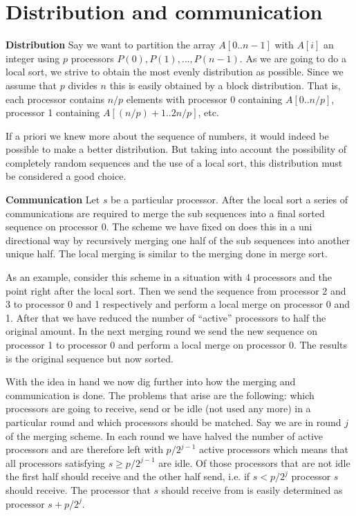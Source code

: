 \documentclass[a4paper,12pt,article]{memoir}
\theoremstyle{plain}
\theoremstyle{definition}
\theoremstyle{remark}
\theoremstyle{plain}
\theoremstyle{remark}
\begin{document}
\section{Distribution and communication}
\textbf{Distribution} Say we want to partition the array $A[0..n-1]$ with $A[i]$ an integer using $p$ processors $P(0),P(1),\ldots,P(n-1)$. As we are going to do a local sort, we strive to obtain the most evenly distribution as possible. Since we assume that $p$ divides $n$ this is easily obtained by a block distribution. That is, each processor contains $n/p$ elements with processor 0 containing $A[0..n/p]$, processor 1 containing $A[(n/p)+1..2n/p]$, etc. 

If a priori we knew more about the sequence of numbers, it would indeed be possible to make a better distribution. But taking into account the possibility of completely random sequences and the use of a local sort, this distribution must be considered a good choice. 

\noindent\textbf{Communication} Let $s$ be a particular processor. After the local sort a series of communications are required to merge the sub sequences into a final sorted sequence on processor 0. The scheme we have fixed on does this in a uni directional way by recursively merging one half of the sub sequences into another unique half. The local merging is similar to the merging done in merge sort.  

As an example, consider this scheme in a situation with 4 processors and the point right after the local sort. Then we send the sequence from processor 2 and 3 to processor 0 and 1 respectively and perform a local merge on processor 0 and 1. After that we have reduced the number of ``active'' processors to half the original amount. In the next merging round we send the new sequence on processor 1 to processor 0 and perform a local merge on processor 0. The results is the original sequence but now sorted. 

With the idea in hand we now dig further into how the merging and communication is done. The problems that arise are the following: which processors are going to receive, send or be idle (not used any more) in a particular round and which processors should be matched. Say we are in round $j$ of the merging scheme. In each round we have halved the number of active processors and are therefore left with $p/2^{j-1}$ active processors which means that all processors satisfying $s\geq p/2^{j-1}$ are idle. Of those processors that are not idle the first half should receive and the other half send, i.e. if $s<p/2^j$ processor $s$ should receive. The processor that $s$ should receive from is easily determined as processor $s+p/2^j$. 
\end{document}
